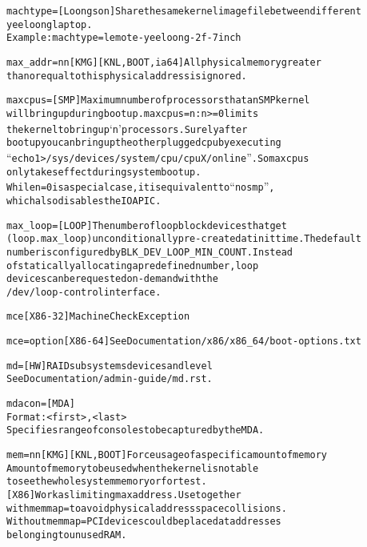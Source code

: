 \documentclass[a4paper,8pt,english]{sphinxmanual}
\begin{document}
\begin{alltt}
        machtype=       {[}Loongson{]} Share the same kernel image file between different
                         yeeloong laptop.
                        Example: machtype=lemote-yeeloong-2f-7inch

        max\_addr=nn{[}KMG{]}        {[}KNL,BOOT,ia64{]} All physical memory greater
                        than or equal to this physical address is ignored.

        maxcpus=        {[}SMP{]} Maximum number of processors that an SMP kernel
                        will bring up during bootup.  maxcpus=n : n \textgreater{}= 0 limits
                        the kernel to bring up `n' processors. Surely after
                        bootup you can bring up the other plugged cpu by executing
                        ``echo 1 \textgreater{} /sys/devices/system/cpu/cpuX/online''. So maxcpus
                        only takes effect during system bootup.
                        While n=0 is a special case, it is equivalent to ``nosmp'',
                        which also disables the IO APIC.

        max\_loop=       {[}LOOP{]} The number of loop block devices that get
        (loop.max\_loop) unconditionally pre-created at init time. The default
                        number is configured by BLK\_DEV\_LOOP\_MIN\_COUNT. Instead
                        of statically allocating a predefined number, loop
                        devices can be requested on-demand with the
                        /dev/loop-control interface.

        mce             {[}X86-32{]} Machine Check Exception

        mce=option      {[}X86-64{]} See Documentation/x86/x86\_64/boot-options.txt

        md=             {[}HW{]} RAID subsystems devices and level
                        See Documentation/admin-guide/md.rst.

        mdacon=         {[}MDA{]}
                        Format: \textless{}first\textgreater{},\textless{}last\textgreater{}
                        Specifies range of consoles to be captured by the MDA.

        mem=nn{[}KMG{]}     {[}KNL,BOOT{]} Force usage of a specific amount of memory
                        Amount of memory to be used when the kernel is not able
                        to see the whole system memory or for test.
                        {[}X86{]} Work as limiting max address. Use together
                        with memmap= to avoid physical address space collisions.
                        Without memmap= PCI devices could be placed at addresses
                        belonging to unused RAM.


\end{alltt}
\end{document}
